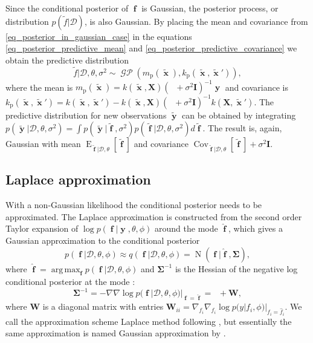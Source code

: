 \documentclass[twoside,11pt]{article}
\DeclareMathOperator{\Kff}{\mathbf{K}_{f,f}}
\DeclareMathOperator{\iKff}{\mathbf{K}_{f,f}^{-1}}
\DeclareMathOperator{\x}{\mathbf{x}}
\DeclareMathOperator{\f}{\mathbf{f}}
\DeclareMathOperator{\y}{\mathbf{y}}
\DeclareMathOperator{\GP}{\mathcal{GP}}
\DeclareMathOperator{\N}{N}
\DeclareMathOperator*{\argmax}{arg\,max}
\newcommand{\mb}{\mathbf}
\DeclareMathOperator{\E}{E}
\DeclareMathOperator{\COV}{Cov}
\begin{document}
Since the conditional posterior of $\f$ is Gaussian, the posterior
process, or distribution $p(\tilde{f}|\mathcal{D})$, is also Gaussian.
By placing the mean and covariance from
\eqref{eq_posterior_in_gaussian_case} in the equations
\eqref{eq_posterior_predictive_mean} and
\eqref{eq_posterior_predictive_covariance} we obtain the predictive
distribution
%
\begin{equation}\label{eq_posterior_predictive_in_gaussian_case}
\tilde{f}|\mathcal{D},\theta, \sigma^2 \sim \GP\left(m_{\text{p}}(\tilde{\x}), k_{\text{p}}(\tilde{\x},\tilde{\x}')\right),
\end{equation}
%
where the mean is $m_{\text{p}}(\tilde{\x}) = k(\tilde{\x},\mb{X})(\Kff +
\sigma^2\mb{I})^{-1}\y$ and covariance is $k_{\text{p}}(\tilde{\x},\tilde{\x}') =k(\tilde{\x},\tilde{\x}') -
k(\tilde{\x},\mb{X})(\Kff +
\sigma^2\mb{I})^{-1}k(\mb{X},\tilde{\x}')$. The predictive
distribution for new observations $\tilde{\y}$ can be obtained by
integrating $p(\tilde{\y}|\mathcal{D},\theta, \sigma^2) = \int
p(\tilde{\y}|\tilde{\f},\sigma^2)p(\tilde{\f}|\mathcal{D},\theta,
\sigma^2)d\tilde{\f}$. The result is, again, Gaussian with mean
$\E_{\tilde{\f}|\mathcal{D},\theta}[\tilde{\f}]$ and covariance
$\COV_{\tilde{\f}|\mathcal{D},\theta}[\tilde{\f}] + \sigma^2\mb{I}$. 

\subsection{Laplace approximation}

With a non-Gaussian likelihood the conditional posterior needs to be
approximated. The Laplace approximation is constructed from the second
order Taylor expansion of $\log p(\f|\y,\theta, \phi)$ around the mode
$\hat{\f}$, which gives a Gaussian approximation to the conditional
posterior
%
\begin{equation}\label{eq_latent_posterior_in_Laplace_case}
p(\f|\mathcal{D},\theta,\phi) \approx q(\f|\mathcal{D},\theta,\phi) =
\N(\f|\hat{\f}, \mb{\Sigma}), 
\end{equation}
%
where $\hat{\f}=\argmax_{\mb{f}} p(\f|\mathcal{D},\theta,\phi)$ and
$\mb{\Sigma}^{-1}$ is the Hessian of the negative log conditional posterior
at the mode \citep{Gelman+etal+BDA3:2013,Rasmussen+Williams:2006}: 
%
\begin{equation}
\mb{\Sigma}^{-1} = -\nabla\nabla \log
p(\f|\mathcal{D},\theta,\phi)|_{\f=\hat{\f}} = \iKff + \mb{W},
\label{Hessian} 
\end{equation}
%
where $\mb{W}$ is a diagonal matrix with entries $\mb{W}_{ii} =
\nabla_{f_i}\nabla_{f_i} \log p(y|f_i,\phi)|_{f_i=\hat{f}_i}$.
%
We call the approximation scheme Laplace method following
\citet{Williams+Barber:1998}, but essentially the same approximation
is named Gaussian approximation by \citet{Rue+Martino+Chopin:2009}.
\end{document}
